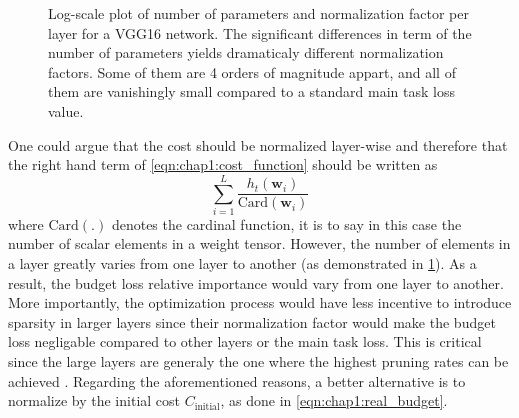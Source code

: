 \begin{figure}
  \centering
    \caption{\centering Log-scale plot of
      number of parameters and normalization factor per layer for a VGG16
      network. The significant differences in term of the number of parameters
      yields dramaticaly different normalization factors. Some of them are 4
      orders of magnitude appart, and all of them are vanishingly small compared
      to a standard main task loss value.} 
  \label{fig:chap1:vgg16_per_layer_param_and_norm_factor}
\end{figure}

One could argue that the cost should be normalized layer-wise and therefore that
the right hand term of \cref{eqn:chap1:cost_function} should be written as
$$\displaystyle\sum_{i=1}^{L}\frac{h_t(\mathbf{w}_i)}{\text{Card}(\mathbf{w}_i)}$$
where $\text{Card}(.)$ denotes the cardinal function, it is to say in this case
the number of scalar elements in a weight tensor. However, the number of
elements in a layer greatly varies from one layer to another (as demonstrated in
\cref{fig:chap1:vgg16_per_layer_param_and_norm_factor}). As a result,  the
budget loss relative importance would vary from one layer to another. More
importantly, the optimization process would have less incentive to introduce
sparsity in larger layers since their normalization factor would make the budget
loss negligable compared to other layers or the main task loss. This is critical
since the large layers are generaly the one where the highest pruning rates can
be achieved \cite{DBLP:journals/corr/abs-2202-12002}. Regarding the
aforementioned reasons, a better alternative is to normalize by the initial cost
$C_\text{initial}$, as done in \cref{eqn:chap1:real_budget}.\\

